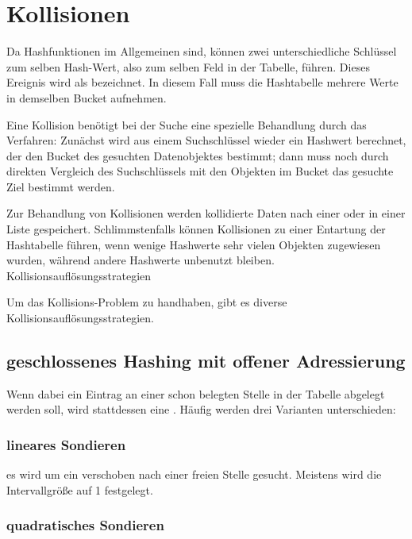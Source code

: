 \documentclass{lehramt-informatik}
\begin{document}
\section{Kollisionen}

Da Hashfunktionen im Allgemeinen  
sind, können zwei unterschiedliche Schlüssel zum selben Hash-Wert, also
zum selben Feld in der Tabelle, führen. Dieses Ereignis wird als
 bezeichnet. In diesem Fall muss die Hashtabelle
mehrere Werte in demselben Bucket aufnehmen.

Eine Kollision benötigt bei der Suche eine spezielle Behandlung durch
das Verfahren: Zunächst wird aus einem Suchschlüssel wieder ein Hashwert
berechnet, der den Bucket des gesuchten Datenobjektes bestimmt; dann
muss noch durch direkten Vergleich des Suchschlüssels mit den Objekten
im Bucket das gesuchte Ziel bestimmt werden.

Zur Behandlung von Kollisionen werden kollidierte Daten nach einer
 oder in einer Liste
gespeichert. Schlimmstenfalls können Kollisionen zu einer Entartung der
Hashtabelle führen, wenn wenige Hashwerte sehr vielen Objekten
zugewiesen wurden, während andere Hashwerte unbenutzt bleiben.
Kollisionsauflösungsstrategien

Um das Kollisions-Problem zu handhaben, gibt es diverse
Kollisionsauflösungsstrategien.

%

\subsection{geschlossenes Hashing mit offener Adressierung}

Wenn dabei ein Eintrag an einer schon belegten Stelle in der
Tabelle abgelegt werden soll, wird stattdessen eine . Häufig werden drei Varianten unterschieden:

\subsubsection{lineares Sondieren}

es wird um ein  verschoben nach einer freien
Stelle gesucht. Meistens wird die Intervallgröße auf 1 festgelegt.

\subsubsection{quadratisches Sondieren}
\end{document}
